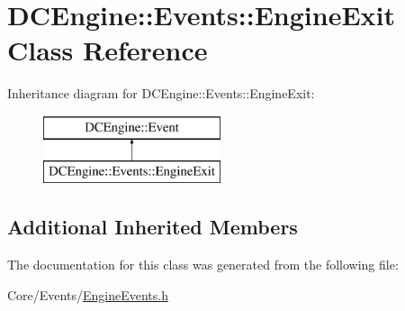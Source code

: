 \hypertarget{classDCEngine_1_1Events_1_1EngineExit}{\section{D\-C\-Engine\-:\-:Events\-:\-:Engine\-Exit Class Reference}
\label{classDCEngine_1_1Events_1_1EngineExit}
}
Inheritance diagram for D\-C\-Engine\-:\-:Events\-:\-:Engine\-Exit\-:\begin{figure}[H]
\begin{center}
\leavevmode
\includegraphics[height=2.000000cm]{classDCEngine_1_1Events_1_1EngineExit}
\end{center}
\end{figure}
\subsection*{Additional Inherited Members}


The documentation for this class was generated from the following file\-:\begin{DoxyCompactItemize}
\item 
Core/\-Events/\hyperlink{EngineEvents_8h}{Engine\-Events.\-h}\end{DoxyCompactItemize}
